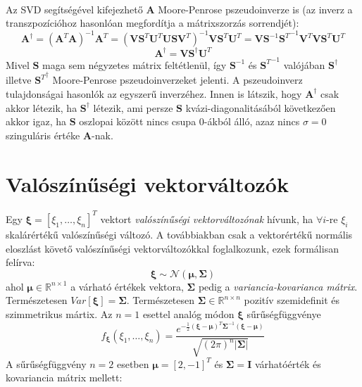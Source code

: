 \documentclass[14p]{report}
\def\pmb{\boldsymbol}
\begin{document}
	\\
	Az SVD segítségével kifejezhető $\pmb{A}$ Moore-Penrose pszeudoinverze is (az inverz a transzpozícióhoz hasonlóan megfordítja a mátrixszorzás sorrendjét):
	\[
		\pmb{A}^{\dagger} = (\pmb{A}^T\pmb{A})^{-1}\pmb{A}^T = (\pmb{V}\pmb{S}^T\pmb{U}^T\pmb{U}\pmb{S}\pmb{V}^T)^{-1}\pmb{V}\pmb{S}^T\pmb{U}^T = \pmb{V}\pmb{S}^{-1}{\pmb{S}^T}^{-1}\pmb{V}^T\pmb{V}\pmb{S}^T\pmb{U}^T
	\]
	\[
		\pmb{A}^{\dagger} = \pmb{V}\pmb{S}^{\dagger}\pmb{U}^T
	\]
	Mivel $\pmb{S}$ maga sem négyzetes mátrix feltétlenül, így $\pmb{S}^{-1}$ és ${\pmb{S}^T}^{-1}$ valójában $\pmb{S}^{\dagger}$ illetve ${\pmb{S}^T}^{\dagger}$ Moore-Penrose pszeudoinverzeket jelenti. A pszeudoinverz tulajdonságai hasonlók az egyszerű inverzéhez.
	Innen is látszik, hogy $\pmb{A}^{\dagger}$ csak akkor létezik, ha $\pmb{S}^{\dagger}$ létezik, ami persze $\pmb{S}$ kvázi-diagonalitásából következően akkor igaz, ha $\pmb{S}$ oszlopai között nincs csupa $0$-ákból álló, azaz nincs $\sigma = 0$ szinguláris értéke $\pmb{A}$-nak.
	
	\section{Valószínűségi vektorváltozók}
	Egy $\pmb{\xi} = [\xi_1, \dots , \xi_n]^T$ vektort \emph{valószínűségi vektorváltozónak} hívunk, ha $\forall i$-re $\xi_i$ skalárértékű valószínűségi változó. A továbbiakban csak a vektorértékű normális eloszlást követő valószínűségi vektorváltozókkal foglalkozunk, ezek formálisan felírva:
	\[
	\pmb{\xi} \sim \mathcal{N}(\pmb{\mu}, \pmb{\Sigma})
	\]
	ahol $\pmb{\mu} \in \mathbb{R}^{n \times 1}$ a várható értékek vektora, $\pmb{\Sigma}$ pedig a \emph{variancia-kovarianca mátrix}. Természetesen $Var[\pmb{\xi}] = \pmb{\Sigma}$. Természetesen $\pmb{\Sigma} \in \mathbb{R}^{n \times n}$ pozitív szemidefinit és szimmetrikus mártix. Az $n = 1$ esettel analóg módon $\pmb{\xi}$ sűrűségfüggvénye
	\[
	f_{\pmb{\xi}}(\xi_1, \dots, \xi_n) = \frac{ e^{-\frac{1}{2}(\pmb{\xi}-\pmb{\mu})^T\pmb{\Sigma}^{-1}(\pmb{\xi}-\pmb{\mu})}}{\sqrt{(2\pi)^n|\pmb{\Sigma}|}}
	\]
	A sűrűségfüggvény $n = 2$ esetben $\pmb{\mu} = [2, -1]^T$ és $\pmb{\Sigma} = \pmb{I}$ várhatóérték és kovariancia mátrix mellett: 
	\def\centerx{2}
	\def\centery{-1}
	
\end{document}
